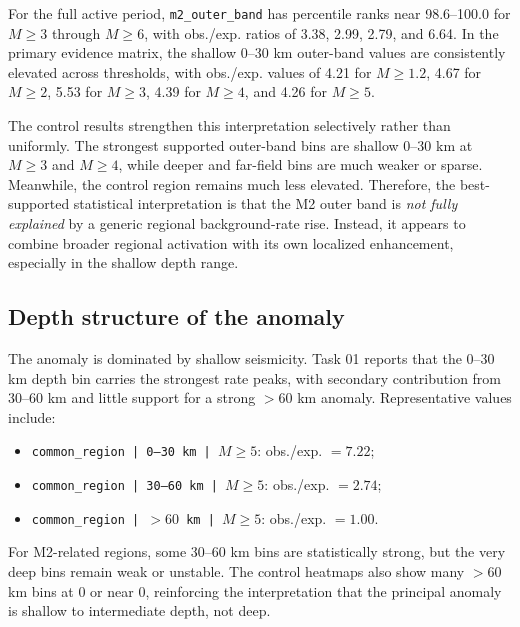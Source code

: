 \documentclass[11pt]{article}
\begin{document}
For the full active period, \texttt{m2\_outer\_band} has percentile ranks near 98.6--100.0 for $M\geq 3$ through $M\geq 6$, with obs./exp. ratios of 3.38, 2.99, 2.79, and 6.64. In the primary evidence matrix, the shallow 0--30 km outer-band values are consistently elevated across thresholds, with obs./exp. values of 4.21 for $M\geq 1.2$, 4.67 for $M\geq 2$, 5.53 for $M\geq 3$, 4.39 for $M\geq 4$, and 4.26 for $M\geq 5$.

The control results strengthen this interpretation selectively rather than uniformly. The strongest supported outer-band bins are shallow 0--30 km at $M\geq 3$ and $M\geq 4$, while deeper and far-field bins are much weaker or sparse. Meanwhile, the control region remains much less elevated. Therefore, the best-supported statistical interpretation is that the M2 outer band is \emph{not fully explained} by a generic regional background-rate rise. Instead, it appears to combine broader regional activation with its own localized enhancement, especially in the shallow depth range.

\subsection{Depth structure of the anomaly}
The anomaly is dominated by shallow seismicity. Task 01 reports that the 0--30 km depth bin carries the strongest rate peaks, with secondary contribution from 30--60 km and little support for a strong $>60$ km anomaly. Representative values include:
\begin{itemize}[leftmargin=1.5em]
    \item \texttt{common\_region | 0--30 km | $M\geq 5$}: obs./exp. $= 7.22$;
    \item \texttt{common\_region | 30--60 km | $M\geq 5$}: obs./exp. $= 2.74$;
    \item \texttt{common\_region | $>60$ km | $M\geq 5$}: obs./exp. $= 1.00$.
\end{itemize}
For M2-related regions, some 30--60 km bins are statistically strong, but the very deep bins remain weak or unstable. The control heatmaps also show many $>60$ km bins at 0 or near 0, reinforcing the interpretation that the principal anomaly is shallow to intermediate depth, not deep.
\end{document}
